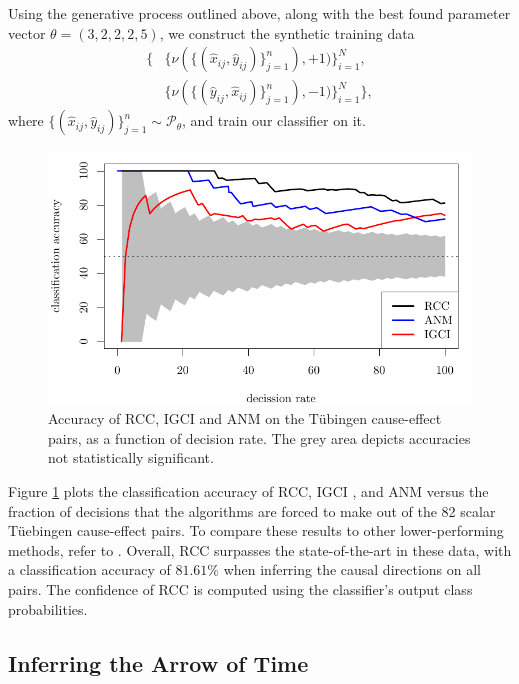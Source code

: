 \documentclass{article}
\renewcommand{\P}{\mathcal{P}}
\begin{document}
Using the generative process outlined above, along with the best found
parameter vector $\theta = (3,2,2,2,5)$, we construct the synthetic training
data 
\begin{align*}
  \{&\{\nu(\{(\hat{x}_{ij}, \hat{y}_{ij})\}_{j=1}^{n}), +1)\}_{i=1}^{N},\\
  &\{\nu(\{(\hat{y}_{ij}, \hat{x}_{ij})\}_{j=1}^{n}), -1)\}_{i=1}^{N}\},
\end{align*}
where $\{(\hat{x}_{ij}, \hat{y}_{ij})\}_{j=1}^{n} \sim \P_\theta$, and train
our classifier on it.

\begin{figure}[t]
  \begin{center}
    \includegraphics[width=\linewidth]{plot.pdf} 
  \end{center}
  \caption{Accuracy of RCC, IGCI and ANM on the T\"ubingen cause-effect pairs,
  as a function of decision rate. The grey area depicts accuracies not
  statistically significant.}
  \label{fig:tuebingen}
\end{figure}

Figure \ref{fig:tuebingen} plots the classification accuracy of RCC, IGCI
\citep{Daniusis12}, and ANM \citep{Mooij14} versus the fraction of decisions
that the algorithms are forced to make out of the 82 scalar T\"uebingen
cause-effect pairs. To compare these results to other lower-performing methods,
refer to \citet{Janzing12}. Overall, RCC surpasses the state-of-the-art in these
data, with a classification accuracy of $81.61\%$ when inferring the causal
directions on all pairs. The confidence of RCC is computed using the
classifier's output class probabilities.

\subsection{Inferring the Arrow of Time}
\end{document}
